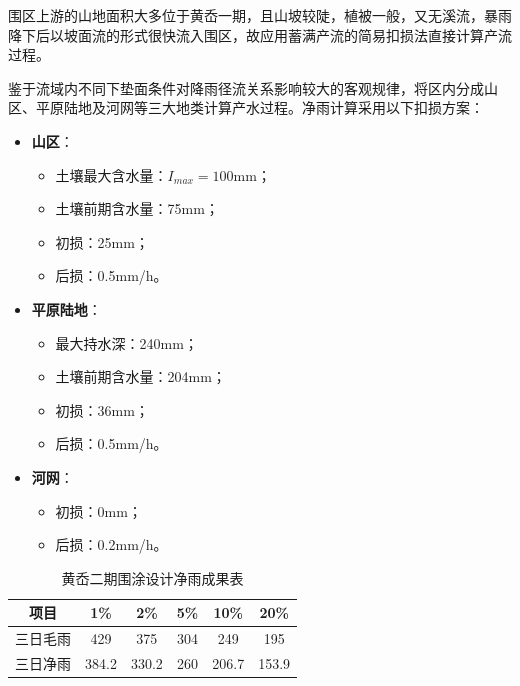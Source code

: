 \documentclass[UTF8, a4paper, 12pt]{ctexart} %
\begin{document}
\par
围区上游的山地面积大多位于黄岙一期，且山坡较陡，植被一般，又无溪流，暴雨降下后以坡面流的形式很快流入围区，故应用蓄满产流的简易扣损法直接计算产流过程。

鉴于流域内不同下垫面条件对降雨径流关系影响较大的客观规律，将区内分成山区、平原陆地及河网等三大地类计算产水过程。净雨计算采用以下扣损方案：

\begin{itemize}
    \item \textbf{山区}：
    \begin{itemize}
        \item 土壤最大含水量：$I_{max}=100$mm；
        \item 土壤前期含水量：75mm；
        \item 初损：25mm；
        \item 后损：0.5mm/h。
    \end{itemize}
    \item \textbf{平原陆地}：
    \begin{itemize}
        \item 最大持水深：240mm；
        \item 土壤前期含水量：204mm；
        \item 初损：36mm；
        \item 后损：0.5mm/h。
    \end{itemize}
    \item \textbf{河网}：
    \begin{itemize}
        \item 初损：0mm；
        \item 后损：0.2mm/h。
    \end{itemize}
\end{itemize}
\newpage
\begin{table}[h]
    \centering
    \caption{黄岙二期围涂设计净雨成果表}
    \begin{tabular}{|c|c|c|c|c|c|}
        \hline
        项目 & 1\% & 2\% & 5\% & 10\% & 20\% \\ \hline
        三日毛雨 & 429 & 375 & 304 & 249 & 195 \\ \hline
        三日净雨 & 384.2 & 330.2 & 260 & 206.7 & 153.9 \\ \hline
    \end{tabular}
    \label{tab:three_day_rainfall}
\end{table}
\end{document}
